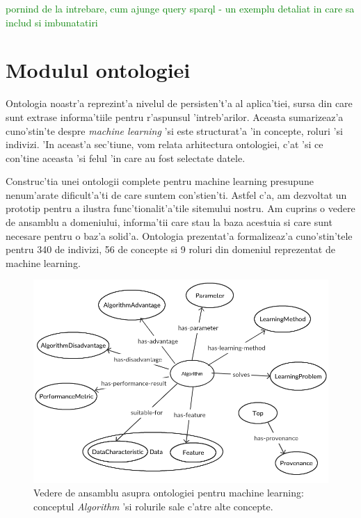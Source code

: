 \documentclass[12pt,a4paper,twoside]{report}
\begin{document}

\textcolor{green}{pornind de la intrebare, cum ajunge query sparql - un exemplu detaliat in care sa includ si imbunatatiri}


\section{Modulul ontologiei}
Ontologia noastr'a reprezint'a nivelul de persisten't'a al aplica'tiei, sursa din care sunt extrase informa'tiile pentru r'aspunsul 'intreb'arilor. Aceasta sumarizeaz'a cuno'stin'te despre {\it machine learning} 'si este structurat'a 'in concepte, roluri 'si indivizi. 'In aceast'a sec'tiune, vom relata arhitectura ontologiei, c'at 'si ce con'tine aceasta 'si felul 'in care au fost selectate datele. 

Construc'tia unei ontologii complete pentru machine learning presupune nenum'arate dificult'a'ti de care suntem con'stien'ti. Astfel c'a, am dezvoltat un prototip pentru a ilustra func'tionalit'a'tile sitemului nostru. Am cuprins o vedere de ansamblu a domeniului, informa'tii care stau la baza acestuia si care sunt necesare pentru o baz'a solid'a. Ontologia prezentat'a formalizeaz'a cuno'stin'tele pentru 340 de indivizi, 56 de concepte si 9 roluri din domeniul reprezentat de machine learning.

\begin{figure}[h!]
    \centering
    \includegraphics[width = 1 \linewidth]{img/ontologie_black.png}
        \caption{Vedere de ansamblu asupra ontologiei pentru machine learning: conceptul {\it Algorithm} 'si rolurile sale c'atre alte concepte.}
    \label{fig:onto}
\end{figure}
\end{document}
